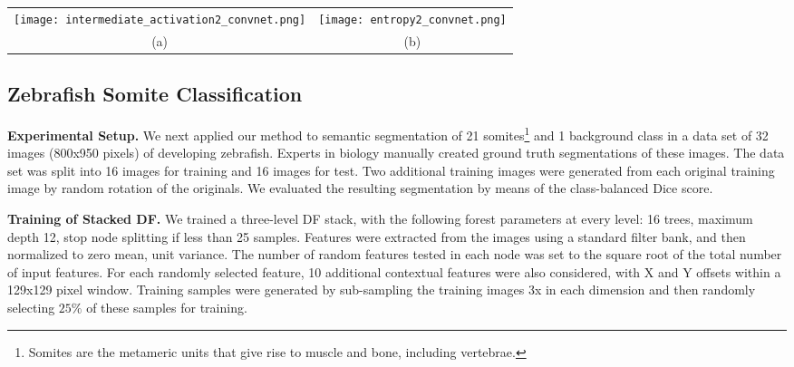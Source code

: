 \documentclass[twocolumn]{svjour3}
\begin{document}
\begin{figure*}[htp!]
\begin{center}
\begin{tabular}{cc}
\centering
   \texttt{[image: intermediate\_activation2\_convnet.png]} &
   \texttt{[image: entropy2\_convnet.png]} \\
	(a) & (b)
\end{tabular}
\end{center}
   \caption{\textbf{Visualization of internal activation layers.} We visualize the probability maps output by the intermediate output layers of the DF stack (\emph{e.g.,} Level 1,2 Output), and the activation maps from the corresponding hidden layers of the ConvNet (\emph{e.g.,} $H_3$, $H_6$) for (a) Kinect body parts, and (b) zebrafish somites. Notice that the activation from the ConvNet appears smoothed along the direction of the foreground classes compared to the noisier output of the stacked DF. Best viewed in colour}
\label{fig:activationLayers}
\end{figure*}


\subsection{Zebrafish Somite Classification}
%
\textbf{Experimental Setup. }
%
We next applied our method to semantic segmentation of 21 somites\footnote{Somites are the metameric units that give rise to muscle and bone, including vertebrae.} and 1 background class in a data set of 32 images (800x950 pixels) of developing zebrafish.
Experts in biology manually created ground truth segmentations of these images.
The data set was split into 16 images for training and 16 images for test.
Two additional training images were generated from each original training image by random rotation of the originals.
We evaluated the resulting segmentation by means of the class-balanced Dice score.

\textbf{Training of Stacked DF. }
%
We trained a three-level DF stack, with the following forest parameters at every level: 16 trees, maximum depth 12, stop node splitting if less than 25 samples. Features were extracted from the images using a standard filter bank, and then normalized to zero mean, unit variance. The number of random features tested in each node was set to the square root of the total number of input features. For each randomly selected feature, 10 additional contextual features were also considered, with X and Y offsets within a 129x129 pixel window. 
Training samples were generated by sub-sampling the training images 3x in each dimension and then randomly selecting $25\%$ of these samples for training.
\end{document}
